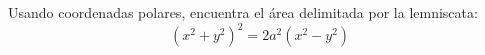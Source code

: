 Usando coordenadas polares, encuentra el área delimitada por la lemniscata:
\[
(x^2 + y^2)^2 = 2a^2(x^2 - y^2)
\]
